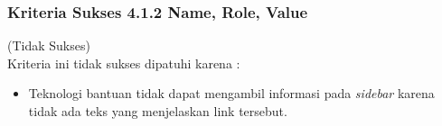 \subsubsection{Kriteria Sukses 4.1.2 Name, Role, Value}
\label{subsubsec:kepatuhan_kriteria_4.1.2}
(Tidak Sukses) \\

Kriteria ini tidak sukses dipatuhi karena : 
\begin{itemize}
	\item Teknologi bantuan tidak dapat mengambil informasi pada \textit{sidebar} karena tidak ada teks yang menjelaskan link tersebut.
\end{itemize}
